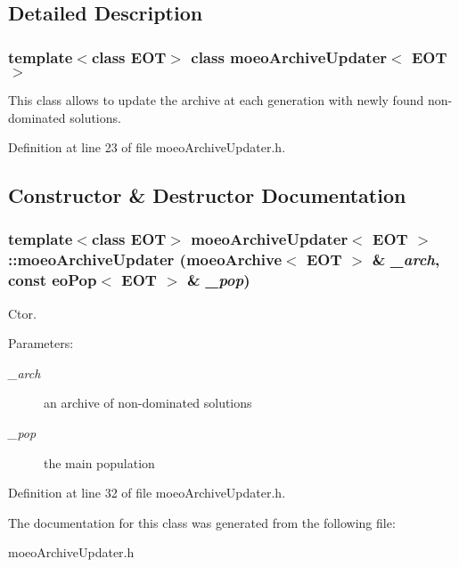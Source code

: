 \subsection{Detailed Description}
\subsubsection*{template$<$class EOT$>$ class moeo\-Archive\-Updater$<$ EOT $>$}

This class allows to update the archive at each generation with newly found non-dominated solutions. 



Definition at line 23 of file moeo\-Archive\-Updater.h.

\subsection{Constructor \& Destructor Documentation}
\subsubsection{\setlength{\rightskip}{0pt plus 5cm}template$<$class EOT$>$ {\bf moeo\-Archive\-Updater}$<$ EOT $>$::{\bf moeo\-Archive\-Updater} ({\bf moeo\-Archive}$<$ EOT $>$ \& {\em \_\-arch}, const eo\-Pop$<$ EOT $>$ \& {\em \_\-pop})\hspace{0.3cm}{\tt  [inline]}}\label{classmoeoArchiveUpdater_71027fd5f8dac7d8069b682c998c03c5}


Ctor. 

\begin{Desc}
\item[Parameters:]
\begin{description}
\item[{\em \_\-arch}]an archive of non-dominated solutions \item[{\em \_\-pop}]the main population \end{description}
\end{Desc}


Definition at line 32 of file moeo\-Archive\-Updater.h.

The documentation for this class was generated from the following file:\begin{CompactItemize}
\item 
moeo\-Archive\-Updater.h\end{CompactItemize}
